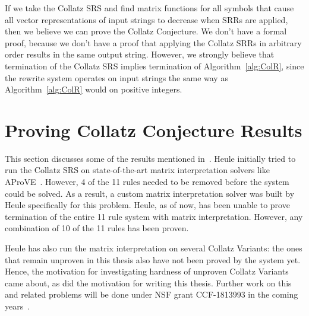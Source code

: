 If we take the Collatz SRS and find matrix functions for all symbols that cause all vector representations of input strings to decrease when SRRs are applied, then we believe we can prove the Collatz Conjecture. We don't have a formal proof, because we don't have a proof that applying the Collatz SRRs in arbitrary order results in the same output string. However, we strongly believe that termination of the Collatz SRS implies termination of Algorithm~\ref{alg:ColR}, since the rewrite system operates on input strings the same way as Algorithm~\ref{alg:ColR} would on positive integers.
\section{Proving Collatz Conjecture Results} \label{subsec:provingCollatzresults}
This section discusses some of the results mentioned in~\cite{HeuleAaronson}. Heule initially tried to run the Collatz SRS on state-of-the-art matrix interpretation solvers like AProVE~\cite{Giesletal:2004}. However, 4 of the 11 rules needed to be removed before the system could be solved. As a result, a custom matrix interpretation solver was built by Heule specifically for this problem. Heule, as of now, has been unable to prove termination of the entire 11 rule system with matrix interpretation. However, any combination of 10 of the 11 rules has been proven. \par
Heule has also run the matrix interpretation on several Collatz Variants: the ones that remain unproven in this thesis also have not been proved by the system yet. Hence, the motivation for investigating hardness of unproven Collatz Variants came about, as did the motivation for writing this thesis. Further work on this and related problems will be done under NSF grant CCF-1813993 in the coming years~\cite{HeuleAaronson}.
